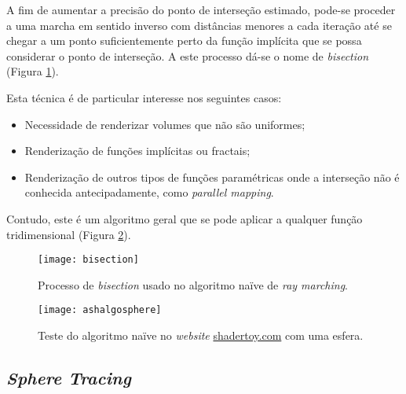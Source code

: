 A fim de aumentar a precisão do ponto de interseção estimado, pode-se proceder a uma marcha em sentido inverso com distâncias menores a cada iteração até se chegar a um ponto suficientemente perto da função implícita que se possa considerar o ponto de interseção. A este processo dá-se o nome de \textit{bisection} (Figura \ref{fig::rmarching2DBisection}).

Esta técnica é de particular interesse nos seguintes casos:
\begin{itemize}
    \item Necessidade de renderizar volumes que não são uniformes;
    \item Renderização de funções implícitas ou fractais;
    \item Renderização de outros tipos de funções paramétricas onde a interseção não é conhecida antecipadamente, como \textit{parallel mapping}.
\end{itemize}

Contudo, este é um algoritmo geral que se pode aplicar a qualquer função tridimensional (Figura \ref{fig::ashalgosphere}).

\begin{figure}[!htbp]
    \centering
    \texttt{[image: bisection]}
    \caption[Processo de \textit{bisection} usado no algoritmo naïve de \textit{ray marching}]{Processo de \textit{bisection} usado no algoritmo naïve de \textit{ray marching}.}
    \label{fig::rmarching2DBisection}
\end{figure}

\begin{figure}[!htbp]
	\centering
	\texttt{[image: ashalgosphere]}
	\caption[Teste do algoritmo naïve numa esfera]{Teste do algoritmo naïve no \textit{website} \url{shadertoy.com} com uma esfera.}
	\label{fig::ashalgosphere}
\end{figure}



\subsection{\textit{Sphere Tracing}}
\label{ssec::arte:raymarch:spheretracing}

